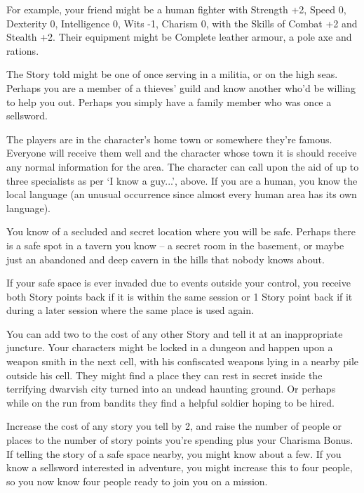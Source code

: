 \begin{multicols}{2}
For example, your friend might be a human fighter with Strength +2, Speed 0, Dexterity 0, Intelligence 0, Wits -1, Charism 0, with the Skills of Combat +2 and Stealth +2. Their equipment might be Complete leather armour, a pole axe and rations.

The Story told might be one of once serving in a militia, or on the high seas. Perhaps you are a member of a thieves' guild and know another who'd be willing to help you out. Perhaps you simply have a family member who was once a sellsword.

The players are in the character's home town or somewhere they're famous. Everyone will receive them well and the character whose town it is should receive any normal information for the area. The character can call upon the aid of up to three specialists as per `I know a guy...', above. If you are a human, you know the local language (an unusual occurrence since almost every human area has its own language).

You know of a secluded and secret location where you will be safe. Perhaps there is a safe spot in a tavern you know -- a secret room in the basement, or maybe just an abandoned and deep cavern in the hills that nobody knows about.

If your safe space is ever invaded due to events outside your control, you receive both Story points back if it is within the same session or 1 Story point back if it during a later session where the same place is used again.

You can add two to the cost of any other Story and tell it at an inappropriate juncture. Your characters might be locked in a dungeon and happen upon a weapon smith in the next cell, with his confiscated weapons lying in a nearby pile outside his cell. They might find a place they can rest in secret inside the terrifying dwarvish city turned into an undead haunting ground. Or perhaps while on the run from bandits they find a helpful soldier hoping to be hired.


Increase the cost of any story you tell by 2, and raise the number of people or places to the number of story points you're spending plus your Charisma Bonus.
If telling the story of a safe space nearby, you might know about a few.
If you know a sellsword interested in adventure, you might increase this to four people, so you now know four people ready to join you on a mission.


\end{multicols}
